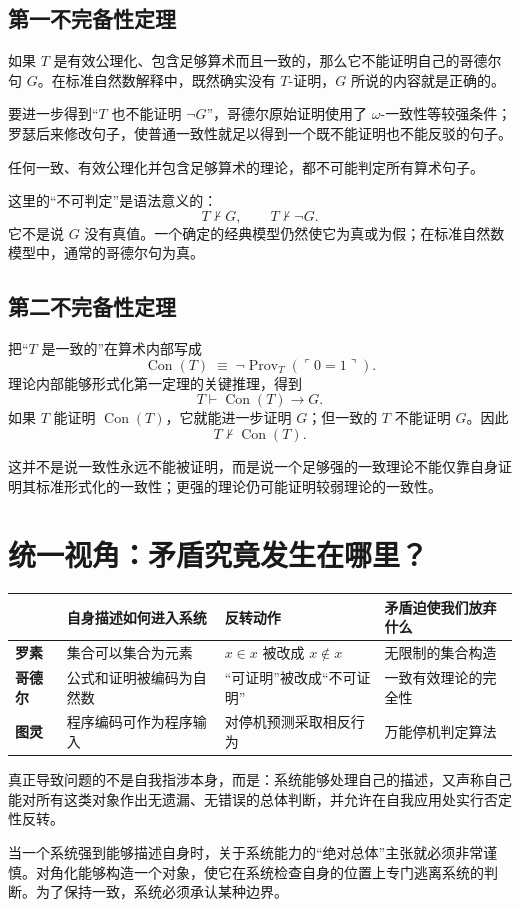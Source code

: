 \documentclass[11pt,a4paper]{article}
\newcommand{\Prov}{\operatorname{Prov}}
\newcommand{\Con}{\operatorname{Con}}
\newcommand{\code}[1]{\ulcorner #1\urcorner}
\begin{document}
\subsection{第一不完备性定理}

如果 $T$ 是有效公理化、包含足够算术而且一致的，那么它不能证明自己的哥德尔句 $G$。在标准自然数解释中，既然确实没有 $T$-证明，$G$ 所说的内容就是正确的。

要进一步得到“$T$ 也不能证明 $\neg G$”，哥德尔原始证明使用了 $\omega$-一致性等较强条件；罗瑟后来修改句子，使普通一致性就足以得到一个既不能证明也不能反驳的句子。

\begin{keybox}[第一不完备性定理]
任何一致、有效公理化并包含足够算术的理论，都不可能判定所有算术句子。
\end{keybox}

这里的“不可判定”是语法意义的：
\[
 T\nvdash G,
 \qquad
 T\nvdash\neg G.
\]
它不是说 $G$ 没有真值。一个确定的经典模型仍然使它为真或为假；在标准自然数模型中，通常的哥德尔句为真。

\subsection{第二不完备性定理}

把“$T$ 是一致的”在算术内部写成
\[
 \Con(T)\;\equiv\;\neg\Prov_T(\code{0=1}).
\]
理论内部能够形式化第一定理的关键推理，得到
\[
 T\vdash\Con(T)\rightarrow G.
\]
如果 $T$ 能证明 $\Con(T)$，它就能进一步证明 $G$；但一致的 $T$ 不能证明 $G$。因此
\[
 \boxed{T\nvdash\Con(T).}
\]

这并不是说一致性永远不能被证明，而是说一个足够强的一致理论不能仅靠自身证明其标准形式化的一致性；更强的理论仍可能证明较弱理论的一致性。

\section{统一视角：矛盾究竟发生在哪里？}

\begin{center}
\renewcommand{\arraystretch}{1.45}
\begin{tabularx}{\textwidth}{>{\bfseries}p{1.9cm} X X X}
\toprule
 & 自身描述如何进入系统 & 反转动作 & 矛盾迫使我们放弃什么 \\
\midrule
罗素 & 集合可以集合为元素 & $x\in x$ 被改成 $x\notin x$ & 无限制的集合构造 \\
哥德尔 & 公式和证明被编码为自然数 & “可证明”被改成“不可证明” & 一致有效理论的完全性 \\
图灵 & 程序编码可作为程序输入 & 对停机预测采取相反行为 & 万能停机判定算法 \\
\bottomrule
\end{tabularx}
\end{center}

\begin{warnbox}[最重要的边界意识]
真正导致问题的不是自我指涉本身，而是：系统能够处理自己的描述，又声称自己能对所有这类对象作出无遗漏、无错误的总体判断，并允许在自我应用处实行否定性反转。
\end{warnbox}


\begin{keybox}[总结]
当一个系统强到能够描述自身时，关于系统能力的“绝对总体”主张就必须非常谨慎。对角化能够构造一个对象，使它在系统检查自身的位置上专门逃离系统的判断。为了保持一致，系统必须承认某种边界。
\end{keybox}
\end{document}
